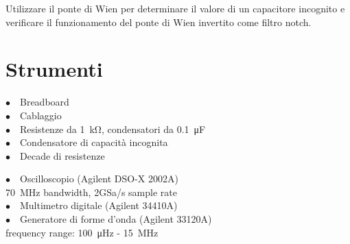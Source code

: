 
Utilizzare il ponte di Wien per determinare il valore di un capacitore incognito e verificare il funzionamento del ponte di Wien invertito come filtro notch.

\section{Strumenti}
%
\phantom{porcodio!}
\noindent
\begin{minipage}{.5\linewidth}
$\bullet \quad$Breadboard\\
$\bullet \quad$Cablaggio\\
$\bullet \quad$Resistenze da \SI{1}{\kilo\ohm}, condensatori da \SI{0.1}{\micro\farad}\\
$\bullet \quad$Condensatore di capacità incognita\\
$\bullet \quad$Decade di resistenze\\
\end{minipage}%
\begin{minipage}{.5\linewidth}
$\bullet \quad$Oscilloscopio (Agilent DSO-X 2002A)\\
\phantom{xxxx}\SI{70}{\mega\hertz} bandwidth, 2GSa/s sample rate\\
$\bullet \quad$Multimetro digitale (Agilent 34410A)\\
$\bullet \quad$Generatore di forme d'onda (Agilent 33120A)\\
\phantom{xxxx}frequency range: \SI{100}{\micro\hertz} - \SI{15}{\mega\hertz}\\
\end{minipage}